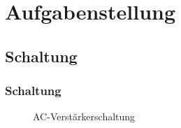 \section{Aufgabenstellung}

\subsection{Schaltung}

\begin{frame}
	\frametitle{Schaltung}
	\begin{figure}
		\centering
		\caption{AC-Verstärkerschaltung}
	\end{figure}
\end{frame}
